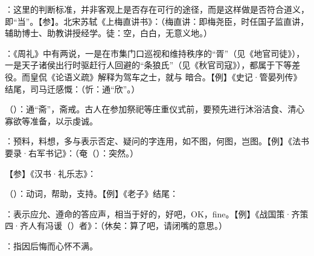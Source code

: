 {
\item {}：这里的判断标准，并非客观上是否存在可行的途径，而是这样做是否符合道义，即“当”。【参】。北宋苏轼《上梅直讲书》：（梅直讲：即梅尧臣，时任国子监直讲，辅助博士、助教讲授经学。徒：空，白白，无意义地。）
\item {}：《周礼》中有两说，一是在市集门口巡视和维持秩序的“胥”（见《地官司徒》），一是天子诸侯出行时驱赶行人回避的“条狼氏”（见《秋官司寇》），都属于下等差役。而皇侃《论语义疏》解释为驾车之士，就与  暗合。【例】《史记·管晏列传》结尾，司马迁感慨：（忻：通“欣”。）
}
{}


{
\item {}（）：通“斋”，斋戒。古人在参加祭祀等庄重仪式前，要预先进行沐浴洁食、清心寡欲等准备，以示虔诚。
}
{}


{
\item {}：预料，料想，多与表示否定、疑问的字连用，如不图，何图，岂图。【例】《法书要录·右军书记》：（奄（）：突然。）%

【参】《汉书·礼乐志》：
}
{}


{
\item {}（）：动词，帮助，支持。【例】《老子》结尾：
\item {}：表示应允、遵命的答应声，相当于好的，好吧，OK，fine。【例】《战国策·齐策四·齐人有冯谖（）者》：（休矣：算了吧，请闭嘴的意思。）
\item {}：指因后悔而心怀不满。
}
{}  %


